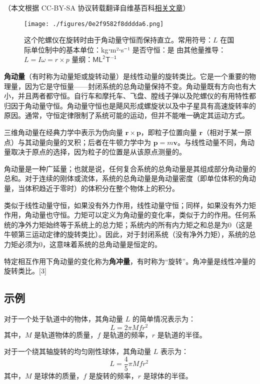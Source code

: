 
（本文根据 CC-BY-SA 协议转载翻译自维基百科\href{https://en.wikipedia.org/wiki/Angular_momentum}{相关文章}）

\begin{figure}[ht]
\centering
\texttt{[image: ./figures/0e2f9582f8dddda6.png]}
\caption{这个陀螺仪在旋转时由于角动量守恒而保持直立。常用符号：\( L \)   在国际单位制中的基本单位：kg⋅m²⋅s⁻¹   是否守恒：是   由其他量推导：\( L = I\omega = r \times p \)   量纲：\( \mathsf{M L^2 T^{-1}} \)} \label{fig_JDL_1}
\end{figure}
\textbf{角动量}（有时称为动量矩或旋转动量）是线性动量的旋转类比。它是一个重要的物理量，因为它是守恒量——封闭系统的总角动量保持不变。角动量既有方向也有大小，并且两者都守恒。自行车和摩托车、飞盘、膛线子弹以及陀螺仪的有用特性都归因于角动量守恒。角动量守恒也是飓风形成螺旋状以及中子星具有高速旋转率的原因。通常，守恒定律限制了系统可能的运动，但并不能唯一确定其运动方式。

三维角动量在经典力学中表示为伪向量 \( \mathbf{r} \times \mathbf{p} \)，即粒子位置向量 \( \mathbf{r} \)（相对于某一原点）与其动量向量的叉积；后者在牛顿力学中为 \( \mathbf{p} = m\mathbf{v} \)。与线性动量不同，角动量取决于原点的选择，因为粒子的位置是从该原点测量的。

角动量是一种广延量；也就是说，任何复合系统的总角动量是其组成部分角动量的总和。对于连续的刚体或流体，系统的总角动量是角动量密度（即单位体积的角动量，当体积趋近于零时）的体积分在整个物体上的积分。

类似于线性动量守恒，如果没有外力作用，线性动量守恒；同样，如果没有外力矩作用，角动量也守恒。力矩可以定义为角动量的变化率，类似于力的作用。任何系统的净外力矩始终等于系统上的总力矩；系统内的所有内力矩之和总是为0（这是牛顿第三运动定律的旋转类比）。因此，对于封闭系统（没有净外力矩），系统的总力矩必须为0，这意味着系统的总角动量是恒定的。

特定相互作用下角动量的变化称为\textbf{角冲量}，有时称为“旋转”。角冲量是线性冲量的旋转类比。[3]

\subsection{示例}

对于一个处于轨道中的物体，其角动量 \( L \) 的简单情况表示为：
\[
L = 2\pi Mfr^2~
\]
其中，\( M \) 是轨道物体的质量，\( f \) 是轨道的频率，\( r \) 是轨道的半径。

对于一个绕其轴旋转的均匀刚性球体，其角动量 \( L \) 表示为：
\[
L = \frac{4}{5} \pi Mfr^2~
\]
其中，\( M \) 是球体的质量，\( f \) 是旋转的频率，\( r \) 是球体的半径。

